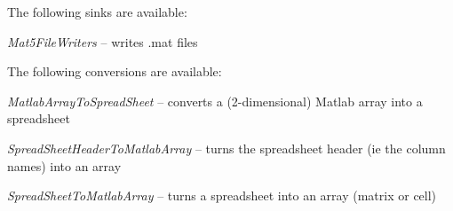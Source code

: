 \documentclass[a4paper]{book}
\begin{document}
The following sinks are available:
\begin{tight_itemize}
  \item \textit{Mat5FileWriters} -- writes .mat files
\end{tight_itemize}

The following conversions are available:
\begin{tight_itemize}
  \item \textit{MatlabArrayToSpreadSheet} -- converts a (2-dimensional) Matlab array into a spreadsheet
  \item \textit{SpreadSheetHeaderToMatlabArray} -- turns the spreadsheet header (ie the column names) into an array
  \item \textit{SpreadSheetToMatlabArray} -- turns a spreadsheet into an array (matrix or cell)
\end{tight_itemize}



\end{document}
